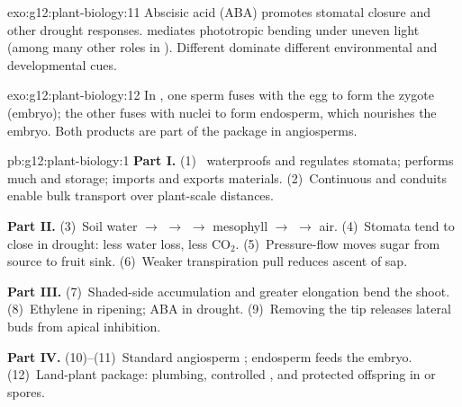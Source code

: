 \begin{solution}{exo:g12:plant-biology:11}
Abscisic acid (ABA) promotes stomatal closure and other drought responses.
 mediates phototropic bending under uneven light (among many other roles
in ). Different  dominate different environmental and
developmental cues.
\end{solution}

\begin{solution}{exo:g12:plant-biology:12}
In , one sperm fuses with the egg to form the zygote
(embryo); the other fuses with  nuclei to form endosperm, which
nourishes the embryo. Both products are part of the  package in
angiosperms.
\end{solution}

\begin{solution}{pb:g12:plant-biology:1}
\textbf{Part I.} (1)~ waterproofs and regulates stomata;  performs much  and storage;  imports and
exports materials. (2)~Continuous  and  conduits enable bulk
transport over plant-scale distances.

\textbf{Part II.} (3)~Soil water $\to$  $\to$  $\to$ mesophyll $\to$
 $\to$ air. (4)~Stomata tend to close in drought: less water loss, less
$\mathrm{CO_2}$. (5)~Pressure-flow moves sugar from source  to fruit sink.
(6)~Weaker transpiration pull reduces ascent of  sap.

\textbf{Part III.} (7)~Shaded-side  accumulation and greater elongation
bend the shoot. (8)~Ethylene in ripening; ABA in drought. (9)~Removing the tip
releases lateral buds from apical  inhibition.

\textbf{Part IV.} (10)--(11)~Standard angiosperm ; endosperm feeds the
embryo. (12)~Land-plant package: plumbing, controlled , and
protected offspring in  or spores.
\end{solution}
